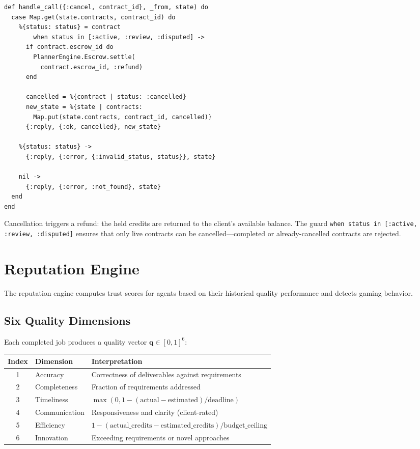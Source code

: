 \documentclass[12pt,a4paper]{article}
\theoremstyle{plain}
\theoremstyle{definition}
\begin{document}
\begin{lstlisting}[caption={Cancellation with automatic refund},label={lst:market-cancel}]
def handle_call({:cancel, contract_id}, _from, state) do
  case Map.get(state.contracts, contract_id) do
    %{status: status} = contract
        when status in [:active, :review, :disputed] ->
      if contract.escrow_id do
        PlannerEngine.Escrow.settle(
          contract.escrow_id, :refund)
      end

      cancelled = %{contract | status: :cancelled}
      new_state = %{state | contracts:
        Map.put(state.contracts, contract_id, cancelled)}
      {:reply, {:ok, cancelled}, new_state}

    %{status: status} ->
      {:reply, {:error, {:invalid_status, status}}, state}

    nil ->
      {:reply, {:error, :not_found}, state}
  end
end
\end{lstlisting}

Cancellation triggers a refund: the held credits are returned to the client's available balance. The guard \texttt{when status in [:active, :review, :disputed]} ensures that only live contracts can be cancelled---completed or already-cancelled contracts are rejected.

\section{Reputation Engine}\label{sec:reputation}

The reputation engine computes trust scores for agents based on their historical quality performance and detects gaming behavior.

\subsection{Six Quality Dimensions}

Each completed job produces a quality vector $\mathbf{q} \in [0, 1]^6$:

\begin{center}
\begin{tabular}{clp{8cm}}
\toprule
\textbf{Index} & \textbf{Dimension} & \textbf{Interpretation} \\
\midrule
1 & Accuracy & Correctness of deliverables against requirements \\
2 & Completeness & Fraction of requirements addressed \\
3 & Timeliness & $\max(0, 1 - (\text{actual} - \text{estimated}) / \text{deadline})$ \\
4 & Communication & Responsiveness and clarity (client-rated) \\
5 & Efficiency & $1 - (\text{actual\_credits} - \text{estimated\_credits}) / \text{budget\_ceiling}$ \\
6 & Innovation & Exceeding requirements or novel approaches \\
\bottomrule
\end{tabular}
\end{center}
\end{document}
